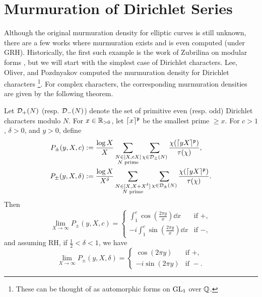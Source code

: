 \section{Murmuration of Dirichlet Series}

Although the original murmuration density for elliptic curves is still unknown, there are a few works where murmuration exists and is even computed (under GRH).
Historically, the first such example is the work of Zubrilina on modular forms \cite{zubrilina2023murmurations}, but we will start with the simplest case of Dirichlet characters.
Lee, Oliver, and Pozdnyakov computed the murmuration density for Dirichlet characters \cite{lee2025murmurations}\footnote{These can be thought of as automorphic forms on $\mathrm{GL}_1$ over $\mathbb{Q}$.}.
For complex characters, the corresponding murmuration densities are given by the following theorem.

\begin{theorem}
    \label{thm:lop_dirichlet}
    Let $\mathcal{D}_{+}(N)$ (resp. $\mathcal{D}_{-}(N)$) denote the set of primitive even (resp. odd) Dirichlet characters modulo $N$.
    For $x \in \mathbb{R}_{> 0}$, let $\lceil x \rceil^{\mathfrak{p}}$ be the smallest prime $\ge x$.
    For $c > 1$, $\delta > 0$, and $y > 0$, define
    \begin{align}
        P_{\pm}(y, X, c) &:= \frac{\log X}{X} \sum_{\substack{N \in [X, cX] \\ N \text{ prime}}} \sum_{\chi \in \mathcal{D}_{\pm}(N)} \frac{\chi(\lceil yX \rceil^{\mathfrak{p}})}{\tau(\chi)}, \label{eqn:lee_1_avg} \\
        P_{\pm}(y, X, \delta) &:= \frac{\log X}{X^\delta} \sum_{\substack{N \in [X, X + X^\delta] \\ N \text{ prime}}} \sum_{\chi \in \mathcal{D}_{\pm}(N)} \frac{\chi(\lceil yX \rceil^{\mathfrak{p}})}{\tau(\chi)}. \label{eqn:lee_2_avg}
    \end{align}
    Then
    \begin{equation}
        \label{eqn:lee_1}
        \lim_{X \to \infty} P_{\pm} (y, X, c) = \begin{cases}
            \int_{1}^{c} \cos\left(\frac{2 \pi y}{x}\right) \dd x & \text{if } +, \\
            -i \int_{1}^{c} \sin \left(\frac{2 \pi y}{x}\right) \dd x & \text{if } -,
        \end{cases}
    \end{equation}
    and assuming RH, if $\frac{1}{2} < \delta < 1$, we have
    \begin{equation}
        \label{eqn:lee_2}
        \lim_{X \to \infty} P_{\pm} (y, X, \delta) = \begin{cases}
            \cos (2 \pi y) & \text{if } +, \\
            -i \sin (2 \pi y) & \text{if } -.
        \end{cases}
    \end{equation}
\end{theorem}

